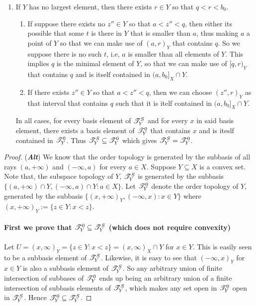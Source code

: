 \documentclass[main.tex]{subfiles}
\begin{document}
{\begin{enumerate}
    \item If $Y$ has no largest element, then there exists $r\in Y$ so that $q<r<b_0$. \begin{enumerate}
        \item If suppose there exists no $z'' \in Y$ so that $a<z''<q$, then either its possible that some $t$ is there in $Y$ that is smaller than $a$, thus making $a$ a point of $Y$ so that we can make use of $(a,r)_Y$ that contains $q$. So we suppose there is no such $t$, i.e, $a$ is smaller than all elements of $Y$. This implies $q$ is the minimal element of $Y$, so that we can make use of $[q,r)_Y$ that contains $q$ and is itself contained in $(a,b_0]_X \cap Y$.
        \item If there exists $z'' \in Y$ so that $a<z''<q$, then we can choose $(z'',r)_Y$ as that interval that contains $q$ such that it is itelf contained in $(a,b_0]_X \cap Y$.
    \end{enumerate} 
In all cases, for every basis element of $\mathscr T^S_Y$ and for every $x$ in said basis element, there exists a basis element of $\mathscr T^0_Y$ that contains $x$ and is iteslf contained in $\mathscr T^0_Y$. Thus $\mathscr T^S_Y \subseteq \mathscr T^0_Y$ which gives $\mathscr T^S_Y=\mathscr T^0_Y$.
\end{enumerate}
\begin{proof} (\emph{\textbf{Alt}}) We know that the order topology is generated by the subbasis of all rays $(a,+\infty)$ and $(-\infty,a)$ for every $a \in X$. Suppose $Y \subseteq X$ is a convex set. Note that, the subspace topology of $Y$, $\mathscr T^S_Y$ is generated by the subbasis $\{(a,+\infty) \cap Y, (-\infty,a) \cap Y: a \in X\}$. Let $\mathscr T^0_Y$ denote the order topology of $Y$, generated by the subbasis $\{(x,+\infty)_Y, (-\infty,x): x \in Y\}$ where $(x,+\infty)_Y:=\{z \in Y: x<z\}$. 
    \\\\ \textbf{First we prove that $\mathscr T^0_Y \subseteq \mathscr T^S_Y$ (which does not require convexity)}
    \\\\ Let $U=(x,\infty)_Y=\{z \in Y: x<z\}=(x,\infty)_X \cap Y$ for $x \in Y$. This is easily seen to be a subbasis element of $\mathscr T^S_Y$. Likewise, it is easy to see that $(-\infty,x)_Y$ for $x \in Y$ is also a subbasis element of $\mathscr T^S_Y$. So any arbitrary union of finite intersection of subbases of $\mathscr T^0_Y$ ends up being an arbitrary union of a finite intersection of subbasis elements of $\mathscr T^S_Y$, which makes any set open in $\mathscr T^0_Y$ open in $\mathscr T^S_Y$. Hence $\mathscr T^0_Y \subseteq \mathscr T^S_Y$.

\end{proof}}
\end{document}
